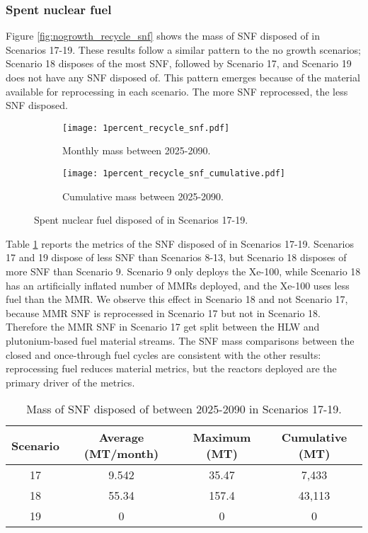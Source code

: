 \subsubsection{Spent nuclear fuel}
Figure \ref{fig:nogrowth_recycle_snf} shows the mass of \gls{SNF} 
disposed of in Scenarios 17-19. These results follow a similar 
pattern to the no growth scenarios; Scenario 18 disposes of 
the most \gls{SNF}, followed by Scenario 17, and Scenario 
19 does not have any \gls{SNF} disposed of. This pattern 
emerges because of the material available for reprocessing 
in each scenario. The more \gls{SNF} reprocessed, the less 
\gls{SNF} disposed. 

\begin{figure}[h!]
    \centering
    \begin{subfigure}[b]{0.49\textwidth}
        \centering
        \texttt{[image: 1percent\_recycle\_snf.pdf]}
        \caption{Monthly mass between 2025-2090.}
        \label{fig:1percent_recycle_snf_all}
    \end{subfigure}
    \hfill
    \begin{subfigure}[b]{0.49\textwidth}
        \centering
        \texttt{[image: 1percent\_recycle\_snf\_cumulative.pdf]}
        \caption{Cumulative mass between 2025-2090.}
        \label{fig:1percent_recycle_snf_cumulative}
    \end{subfigure}
       \caption{Spent nuclear fuel disposed of in Scenarios 17-19.}
       \label{fig:1percent_recycle_snf}
\end{figure}

Table \ref{tab:s17-19_snf} reports the metrics of the \gls{SNF} 
disposed of in Scenarios 17-19. Scenarios 17 and 19 dispose of 
less \gls{SNF} than Scenarios 8-13, but Scenario 18 disposes of 
more \gls{SNF} than Scenario 9. Scenario 9 only deploys the 
Xe-100, while Scenario 18 has an artificially inflated number of 
\glspl{MMR} deployed, and the Xe-100 uses less fuel than the 
\gls{MMR}. We observe this effect in Scenario 18 and not 
Scenario 17, because \gls{MMR} \gls{SNF} is reprocessed in 
Scenario 17 but not in Scenario 18. Therefore the \gls{MMR} 
\gls{SNF} in Scenario 17 get split between the 
\gls{HLW} and plutonium-based fuel material streams. The \gls{SNF} mass comparisons 
between the closed and once-through fuel cycles are consistent 
with the other results: reprocessing fuel reduces material metrics, 
but the reactors deployed are the primary driver of the metrics. 

\begin{table}[h!]
    \centering 
    \caption{Mass of SNF disposed of between 2025-2090 in 
    Scenarios 17-19.}
    \label{tab:s17-19_snf}
    \begin{tabular}{c c c c}
        \hline 
        Scenario & Average (MT/month) & Maximum (MT) & Cumulative (MT) \\
        \hline
        17 & 9.542 & 35.47 & 7,433\\
        18 & 55.34 & 157.4 & 43,113\\
        19 & 0 & 0 & 0 \\
        \hline
    \end{tabular}
\end{table}


